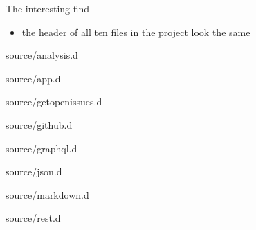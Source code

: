 \documentclass[aspectratio=169,notes]{beamer}
\begin{document}
	\begin{frame}[fragile]{The interesting find}
		\begin{itemize}
			\item the header of all ten files in the project look the same
		\end{itemize}
	\end{frame}
	\begin{frame}[fragile]{source/analysis.d}
		
	\end{frame}
	\begin{frame}[fragile]{source/app.d}
		
	\end{frame}
	\begin{frame}[fragile]{source/getopenissues.d}
		
	\end{frame}
	\begin{frame}[fragile]{source/github.d}
		
	\end{frame}
	\begin{frame}[fragile]{source/graphql.d}
		
	\end{frame}
	\begin{frame}[fragile]{source/json.d}
		
	\end{frame}
	\begin{frame}[fragile]{source/markdown.d}
		
	\end{frame}
	\begin{frame}[fragile]{source/rest.d}
		
	\end{frame}
\end{document}

